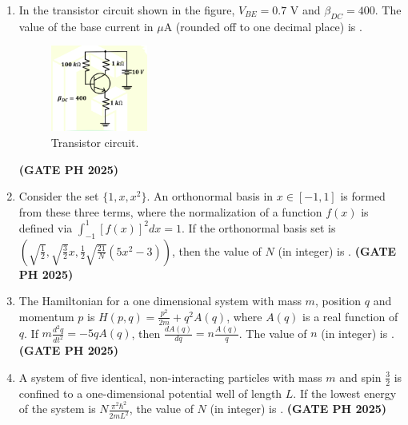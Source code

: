 \documentclass[14pt, a4paper]{extarticle}
\begin{document}
\begin{enumerate}[label=\textbf{Q.\arabic*}]
\item In the transistor circuit shown in the figure, $V_{BE} = 0.7$ V and $\beta_{DC} = 400$. The value of the base current in $\mu$A (rounded off to one decimal place) is \underline{\hspace{3cm}}.
\begin{figure}[H]
\centering
\includegraphics[width=0.3\textwidth]{figs/q60fig25.png}
\caption{Transistor circuit.}
\label{fig:q60_transistor_circuit}
\end{figure}
\hfill \textbf{(GATE PH 2025)}

\item Consider the set $\{1, x, x^2\}$. An orthonormal basis in $x \in [-1, 1]$ is formed from these three terms, where the normalization of a function $f(x)$ is defined via $\int_{-1}^1 [f(x)]^2dx = 1$. If the orthonormal basis set is $\left(\sqrt{\frac{1}{2}}, \sqrt{\frac{3}{2}}x, \frac{1}{2}\sqrt{\frac{21}{N}}(5x^2-3)\right)$, then the value of $N$ (in integer) is \underline{\hspace{3cm}}.
\hfill \textbf{(GATE PH 2025)}

\item The Hamiltonian for a one dimensional system with mass $m$, position $q$ and momentum $p$ is $H(p, q) = \frac{p^2}{2m} + q^2A(q)$, where $A(q)$ is a real function of $q$. If $m\frac{d^2q}{dt^2} = -5qA(q)$, then $\frac{dA(q)}{dq} = n\frac{A(q)}{q}$. The value of $n$ (in integer) is \underline{\hspace{3cm}}.
\hfill \textbf{(GATE PH 2025)}

\item A system of five identical, non-interacting particles with mass $m$ and spin $\frac{3}{2}$ is confined to a one-dimensional potential well of length $L$. If the lowest energy of the system is $N\frac{\pi^2\hbar^2}{2mL^2}$, the value of $N$ (in integer) is \underline{\hspace{3cm}}.
\hfill \textbf{(GATE PH 2025)}


\end{enumerate}
\end{document}
